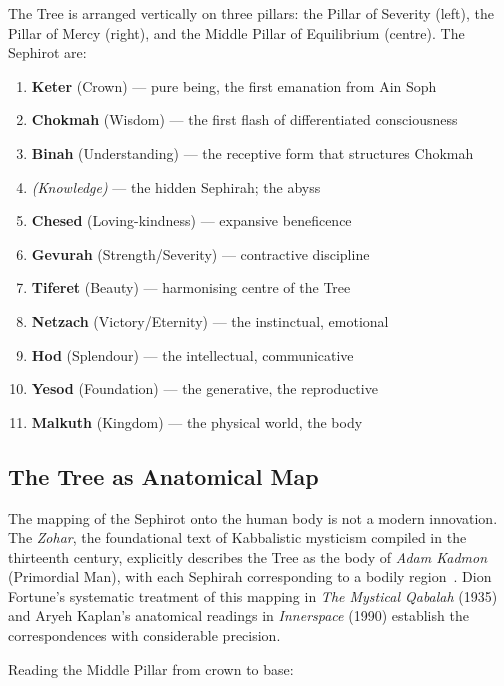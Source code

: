\documentclass[12pt, a4paper]{article}
\begin{document}
The Tree is arranged vertically on three pillars: the Pillar of Severity
(left), the Pillar of Mercy (right), and the Middle Pillar of Equilibrium
(centre). The Sephirot are:

\begin{enumerate}[leftmargin=2cm]
  \item \textbf{Keter} (Crown) — pure being, the first emanation from Ain Soph
  \item \textbf{Chokmah} (Wisdom) — the first flash of differentiated consciousness
  \item \textbf{Binah} (Understanding) — the receptive form that structures Chokmah
  \item[\textit{(Da'at)}] \textit{(Knowledge)} — the hidden Sephirah; the abyss
  \item \textbf{Chesed} (Loving-kindness) — expansive beneficence
  \item \textbf{Gevurah} (Strength/Severity) — contractive discipline
  \item \textbf{Tiferet} (Beauty) — harmonising centre of the Tree
  \item \textbf{Netzach} (Victory/Eternity) — the instinctual, emotional
  \item \textbf{Hod} (Splendour) — the intellectual, communicative
  \item \textbf{Yesod} (Foundation) — the generative, the reproductive
  \item \textbf{Malkuth} (Kingdom) — the physical world, the body
\end{enumerate}

\subsection{The Tree as Anatomical Map}

The mapping of the Sephirot onto the human body is not a modern innovation.
The \emph{Zohar}, the foundational text of Kabbalistic mysticism compiled in
the thirteenth century, explicitly describes the Tree as the body of
\emph{Adam Kadmon} (Primordial Man), with each Sephirah corresponding to a
bodily region~\autocite[143]{zohar2003}. Dion Fortune's systematic treatment
of this mapping in \emph{The Mystical Qabalah} (1935) and Aryeh Kaplan's
anatomical readings in \emph{Innerspace} (1990) establish the correspondences
with considerable precision.

Reading the Middle Pillar from crown to base:
\end{document}
